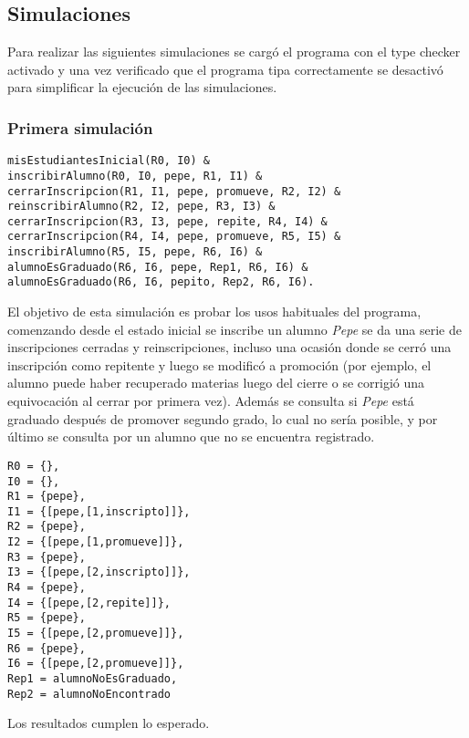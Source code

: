 \documentclass{article}
\begin{document}
\subsection*{Simulaciones}
Para realizar las siguientes simulaciones se cargó el programa con el type checker activado y una vez verificado que el programa tipa correctamente se desactivó para simplificar la ejecución de las simulaciones.

\subsubsection*{Primera simulación}
\begin{verbatim}
misEstudiantesInicial(R0, I0) & 
inscribirAlumno(R0, I0, pepe, R1, I1) & 
cerrarInscripcion(R1, I1, pepe, promueve, R2, I2) & 
reinscribirAlumno(R2, I2, pepe, R3, I3) & 
cerrarInscripcion(R3, I3, pepe, repite, R4, I4) & 
cerrarInscripcion(R4, I4, pepe, promueve, R5, I5) & 
inscribirAlumno(R5, I5, pepe, R6, I6) & 
alumnoEsGraduado(R6, I6, pepe, Rep1, R6, I6) & 
alumnoEsGraduado(R6, I6, pepito, Rep2, R6, I6).
\end{verbatim}

El objetivo de esta simulación es probar los usos habituales del programa, comenzando
desde el estado inicial se inscribe un alumno \emph{Pepe} se da una serie de inscripciones cerradas y reinscripciones, incluso una ocasión donde se cerró una inscripción como repitente y luego se modificó a promoción (por ejemplo, el alumno puede haber recuperado materias luego del cierre o se corrigió una equivocación al cerrar por primera vez). Además se consulta si \emph{Pepe} está graduado después de promover segundo grado, lo cual no sería posible, y por último se consulta por un alumno que no se encuentra registrado.

\begin{verbatim}
R0 = {},  
I0 = {},  
R1 = {pepe},  
I1 = {[pepe,[1,inscripto]]},  
R2 = {pepe},  
I2 = {[pepe,[1,promueve]]},  
R3 = {pepe},  
I3 = {[pepe,[2,inscripto]]},  
R4 = {pepe},  
I4 = {[pepe,[2,repite]]},  
R5 = {pepe},  
I5 = {[pepe,[2,promueve]]},  
R6 = {pepe},  
I6 = {[pepe,[2,promueve]]},  
Rep1 = alumnoNoEsGraduado,  
Rep2 = alumnoNoEncontrado
\end{verbatim}

Los resultados cumplen lo esperado.
\end{document}

